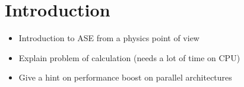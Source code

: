 \section{Introduction}
\begin{itemize}

  \item Introduction to ASE from a physics point of view

  \item Explain problem of calculation (needs a lot of time on CPU)

  \item Give a hint on performance boost on parallel architectures

\end{itemize}

